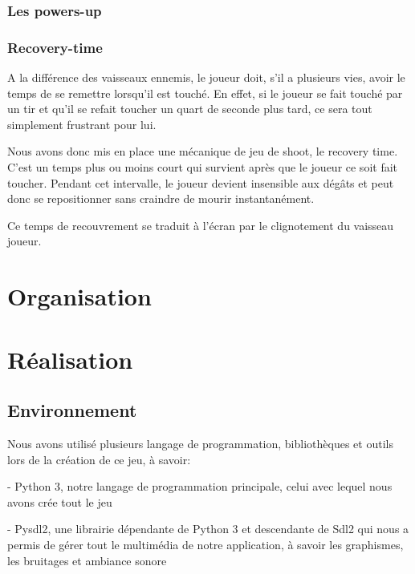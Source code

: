 \documentclass{article}
\begin{document}
\subsubsection{Les powers-up}

\subsubsection{Recovery-time}

A la différence des vaisseaux ennemis, le joueur doit, s'il a plusieurs vies, avoir le temps de se remettre lorsqu'il est touché. En effet, si le joueur se fait touché par un tir et qu'il se refait toucher un quart de seconde plus tard, ce sera tout simplement frustrant pour lui. \newline

Nous avons donc mis en place une mécanique de jeu de shoot, le recovery time. C'est un temps plus ou moins court qui survient après que le joueur ce soit fait toucher. Pendant cet intervalle, le joueur devient insensible aux dégâts et peut donc se repositionner sans craindre de mourir instantanément. \newline

Ce temps de recouvrement se traduit à l'écran par le clignotement du vaisseau joueur. \newpage

\section{Organisation }

\newpage

\section{Réalisation}

\subsection{Environnement}

Nous avons utilisé plusieurs langage de programmation, bibliothèques et outils lors de la création de ce jeu, à savoir: \newline

- Python 3, notre langage de programmation principale, celui avec lequel nous avons crée tout le jeu \newline

- Pysdl2, une librairie dépendante de Python 3 et descendante de Sdl2 qui nous a permis de gérer tout le multimédia de notre application, à savoir les graphismes, les bruitages et ambiance sonore \newline
\end{document}
